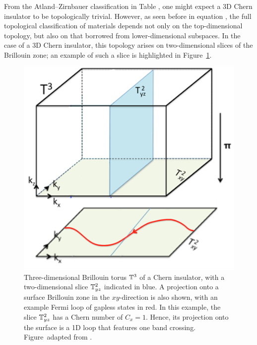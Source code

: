 From the Atland--Zirnbauer classification in Table \red{[reference]},%
one might expect a 3D Chern insulator to be topologically trivial. However, as seen before in equation ,%
the full topological classification of materials depends not only on the top-dimensional topology, but also on that borrowed from lower-dimensional subspaces. In the case of a 3D Chern insulator, this topology arises on two-dimensional slices of the Brillouin zone; an example of such a slice is highlighted in Figure~\ref{fig:3D_Chern_insulator}.
\begin{figure}[htb!]
	\centering
	\includegraphics[width=.5\linewidth]{Images/3D_Chern_insulator}
	\caption{
		Three-dimensional Brillouin torus $\mathbb{T}^3$ of a Chern insulator, with a two-dimensional slice $\mathbb{T}_{yz}^2$ indicated in blue. A projection onto a surface Brillouin zone in the $xy$-direction is also shown, with an example Fermi loop of gapless states in red. In this example, the slice $\mathbb{T}_{yz}^2$ has a Chern number of $C_{x} = 1$. Hence, its projection onto the surface is a 1D loop that features one band crossing.
		Figure~adapted from \cite{Mathai_math-review}.}
	\label{fig:3D_Chern_insulator}
\end{figure}

